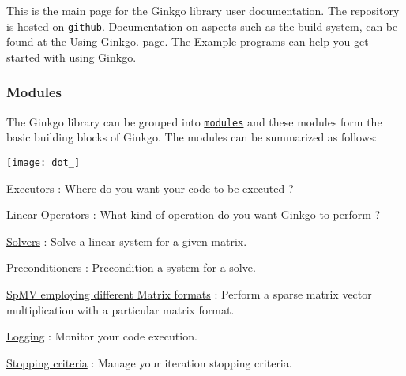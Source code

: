 This is the main page for the Ginkgo library user documentation. The repository is hosted on \href{https://github.com/ginkgo-project/ginkgo}{\tt github}. Documentation on aspects such as the build system, can be found at the \hyperlink{using_ginkgo}{Using Ginkgo.} page. The \hyperlink{Examples}{Example programs} can help you get started with using Ginkgo.

\subsubsection*{Modules}

The Ginkgo library can be grouped into \href{modules.html}{\tt modules} and these modules form the basic building blocks of Ginkgo. The modules can be summarized as follows\+:


\begin{DoxyImageNoCaption}
  \mbox{\texttt{[image: dot\_]}}
\end{DoxyImageNoCaption}



\begin{DoxyItemize}
\item \hyperlink{group__Executor}{Executors} \+: Where do you want your code to be executed ?
\item \hyperlink{group__LinOp}{Linear Operators} \+: What kind of operation do you want Ginkgo to perform ?
\begin{DoxyItemize}
\item \hyperlink{group__solvers}{Solvers} \+: Solve a linear system for a given matrix.
\item \hyperlink{group__precond}{Preconditioners} \+: Precondition a system for a solve.
\item \hyperlink{group__mat__formats}{Sp\+MV employing different Matrix formats} \+: Perform a sparse matrix vector multiplication with a particular matrix format.
\end{DoxyItemize}
\item \hyperlink{group__log}{Logging} \+: Monitor your code execution.
\item \hyperlink{group__stop}{Stopping criteria} \+: Manage your iteration stopping criteria. 
\end{DoxyItemize}